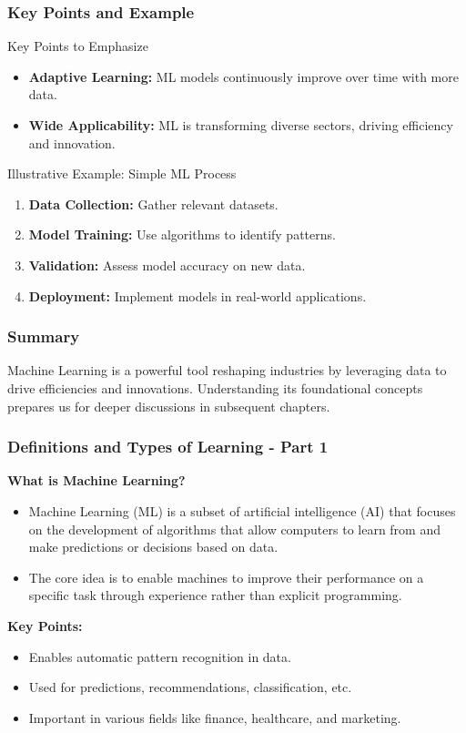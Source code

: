 \documentclass{beamer}
\begin{document}
\begin{frame}[fragile]
    \frametitle{Key Points and Example}
    \begin{block}{Key Points to Emphasize}
        \begin{itemize}
            \item \textbf{Adaptive Learning:} ML models continuously improve over time with more data.
            \item \textbf{Wide Applicability:} ML is transforming diverse sectors, driving efficiency and innovation.
        \end{itemize}
    \end{block}

    \begin{block}{Illustrative Example: Simple ML Process}
        \begin{enumerate}
            \item \textbf{Data Collection:} Gather relevant datasets.
            \item \textbf{Model Training:} Use algorithms to identify patterns.
            \item \textbf{Validation:} Assess model accuracy on new data.
            \item \textbf{Deployment:} Implement models in real-world applications.
        \end{enumerate}
    \end{block}
\end{frame}

\begin{frame}[fragile]
    \frametitle{Summary}
    Machine Learning is a powerful tool reshaping industries by leveraging data to drive efficiencies and innovations. Understanding its foundational concepts prepares us for deeper discussions in subsequent chapters.
\end{frame}

\begin{frame}[fragile]
    \frametitle{Definitions and Types of Learning - Part 1}
    
    \textbf{What is Machine Learning?}

    \begin{itemize}
        \item Machine Learning (ML) is a subset of artificial intelligence (AI) that focuses on the development of algorithms that allow computers to learn from and make predictions or decisions based on data.
        \item The core idea is to enable machines to improve their performance on a specific task through experience rather than explicit programming.
    \end{itemize}

    \textbf{Key Points:}
    \begin{itemize}
        \item Enables automatic pattern recognition in data.
        \item Used for predictions, recommendations, classification, etc.
        \item Important in various fields like finance, healthcare, and marketing.
    \end{itemize}
\end{frame}
\end{document}

